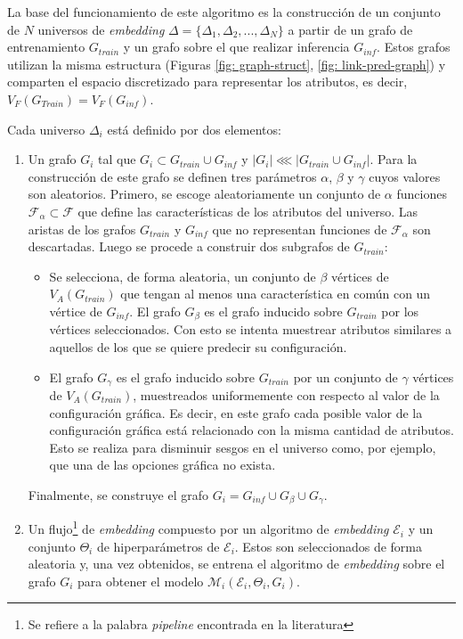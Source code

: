 La base del funcionamiento de este algoritmo es la construcci\'on de
un conjunto de $N$ universos de \textit{embedding} $\Delta = \{\Delta_1, \Delta_2, ..., \Delta_N\}$
a partir de un grafo de entrenamiento $G_{train}$ y un grafo sobre el que realizar inferencia $G_{inf}$.
Estos grafos utilizan la misma estructura (Figuras \ref{fig: graph-struct}, \ref{fig: link-pred-graph}) y comparten el espacio discretizado
para representar los atributos, es decir, $V_F(G_{Train}) = V_F(G_{inf})$.

Cada universo $\Delta_i$ est\'a definido por dos elementos:
\begin{enumerate}
    \item Un grafo $G_i$ tal que $G_i \subset G_{train} \cup G_{inf}$ y $|G_i| \lll |G_{train} \cup G_{inf}|$.
    Para la construcci\'on de este grafo se definen tres par\'ametros $\alpha$, $\beta$ y $\gamma$ cuyos valores son aleatorios.
    Primero, se escoge aleatoriamente un conjunto de $\alpha$ funciones $\mathcal{F}_\alpha \subset \mathcal{F}$
    que define las caracter\'isticas de los atributos del universo. Las aristas de los
    grafos $G_{train}$ y $G_{inf}$ que no representan funciones de $\mathcal{F}_\alpha$ son descartadas. Luego se procede a construir
     dos subgrafos de $G_{train}$:
    \begin{itemize}
        \item Se selecciona, de forma aleatoria, un conjunto de $\beta$ v\'ertices de $V_A(G_{train})$
        que tengan al menos una caracter\'istica en com\'un con un v\'ertice de $G_{inf}$.
        El grafo $G_\beta$ es el grafo inducido sobre $G_{train}$ por los v\'ertices seleccionados.
        Con esto se intenta muestrear atributos similares a aquellos de los que se quiere predecir su configuraci\'on.
        \item El grafo $G_\gamma$ es el grafo inducido sobre $G_{train}$ por un conjunto de $\gamma$
        v\'ertices de $V_A(G_{train})$, muestreados uniformemente con respecto al valor de la configuraci\'on gr\'afica. Es decir,
        en este grafo cada posible valor de la configuraci\'on gr\'afica est\'a relacionado con la misma cantidad de atributos. Esto se realiza
        para disminuir sesgos en el universo como, por ejemplo, que una de las opciones gr\'afica no exista.
    \end{itemize}
    Finalmente, se construye el grafo $G_i = G_{inf} \cup G_\beta \cup G_\gamma$. 
    \item Un flujo\footnote[1]{Se refiere a la palabra \textit{pipeline} encontrada en la literatura} de \textit{embedding}
    compuesto por un algoritmo de \textit{embedding} $\mathcal{E}_i$ y un conjunto $\Theta_i$ de hiperpar\'ametros de $\mathcal{E}_i$.
    Estos son seleccionados de forma aleatoria y, una vez obtenidos, se entrena el algoritmo
    de \textit{embedding} sobre el grafo $G_i$ para obtener el modelo $\mathcal{M}_i(\mathcal{E}_i, \Theta_i, G_i)$.
\end{enumerate} 

